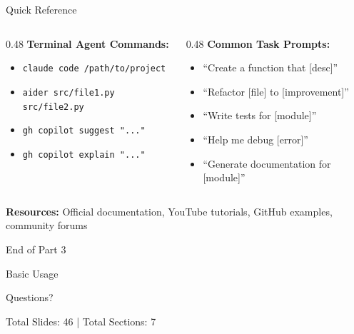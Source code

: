 \documentclass[aspectratio=169,11pt]{beamer}
\begin{document}
\begin{frame}{Quick Reference}
    \small
    \begin{columns}[T]
        \begin{column}{0.48\textwidth}
            \textbf{Terminal Agent Commands:}
            \begin{itemize}
                \item \texttt{claude code /path/to/project}
                \item \texttt{aider src/file1.py src/file2.py}
                \item \texttt{gh copilot suggest "..."}
                \item \texttt{gh copilot explain "..."}
            \end{itemize}
        \end{column}
        \begin{column}{0.48\textwidth}
            \textbf{Common Task Prompts:}
            \begin{itemize}
                \item ``Create a function that [desc]''
                \item ``Refactor [file] to [improvement]''
                \item ``Write tests for [module]''
                \item ``Help me debug [error]''
                \item ``Generate documentation for [module]''
            \end{itemize}
        \end{column}
    \end{columns}

    \vspace{0.5cm}
    \begin{center}
        \textbf{Resources:} Official documentation, YouTube tutorials, GitHub examples, community forums
    \end{center}
\end{frame}

\begin{frame}[plain]
    \begin{center}
        \vspace{2cm}
        {\Huge\textcolor{UofSCGarnet}{End of Part 3}}

        \vspace{1cm}
        {\Large Basic Usage}

        \vspace{1cm}
        {\large Questions?}

        \vspace{2cm}
        \textcolor{UofSC70Black}{\small Total Slides: 46 | Total Sections: 7}
    \end{center}
\end{frame}
\end{document}
